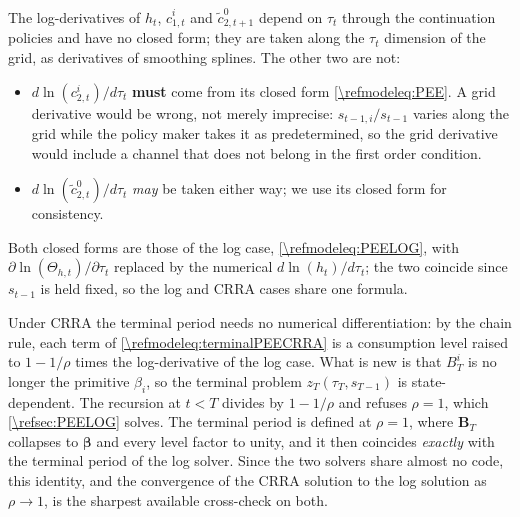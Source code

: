 The log-derivatives of $h_t$, $\hat{c}_{1,t}^i$ and $\tilde{c}_{2,t+1}^0$ depend on $\tau_t$ through the continuation policies and have no closed form; they are taken along the $\tau_t$ dimension of the grid, as derivatives of smoothing splines. The other two are not:
\begin{itemize}
    \item $d\ln(c_{2,t}^i)/d\tau_t$ \textbf{must} come from its closed form \eqref{\refmodeleq:PEE}. A grid derivative would be wrong, not merely imprecise: $s_{t-1,i}/s_{t-1}$ varies along the grid while the policy maker takes it as predetermined, so the grid derivative would include a channel that does not belong in the first order condition.
    \item $d\ln(\tilde{c}_{2,t}^0)/d\tau_t$ \emph{may} be taken either way; we use its closed form for consistency.
\end{itemize}
Both closed forms are those of the log case, \eqref{\refmodeleq:PEELOG}, with $\partial\ln(\Theta_{h,t})/\partial\tau_t$ replaced by the numerical $d\ln(h_t)/d\tau_t$; the two coincide since $s_{t-1}$ is held fixed, so the log and CRRA cases share one formula.

Under CRRA the terminal period needs no numerical differentiation: by the chain rule, each term of \eqref{\refmodeleq:terminalPEECRRA} is a consumption level raised to $1-1/\rho$ times the log-derivative of the log case. What is new is that $B_T^i$ is no longer the primitive $\beta_i$, so the terminal problem $z_T(\tau_T, s_{T-1})$ is state-dependent. The recursion at $t<T$ divides by $1-1/\rho$ and refuses $\rho = 1$, which \cref{\refsec:PEELOG} solves. The terminal period is defined at $\rho = 1$, where $\bm{B}_T$ collapses to $\bm{\beta}$ and every level factor to unity, and it then coincides \emph{exactly} with the terminal period of the log solver. Since the two solvers share almost no code, this identity, and the convergence of the CRRA solution to the log solution as $\rho\rightarrow 1$, is the sharpest available cross-check on both.

